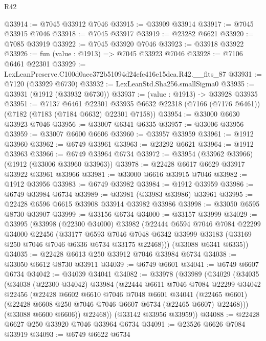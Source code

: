 \begin{lexlean}{R42}
\begin{coremodule}
{@33914 := @7045 @33912 @7046
@33915 := @33909 @33914
@33917 := @7045 @33915 @7046
@33918 := @7045 @33917
@33919 := @23282 @6621
@33920 := @7085 @33919
@33922 := @7045 @33920 @7046
@33923 := @33918 @33922
@33926 := fun (value : @1913) => @7045 @33923 @7046
@33928 := @7106 @6461 @22301
@33929 := LexLeanPreserve.C100d0aec372b51094d24efe416e15dca.R42.__fits_87
@33931 := @7120 (@33929 @6730)
@33932 := LexLeanStd.Sha256.smallSigma0
@33935 := @33931 (@1912 (@33932 @6730))
@33937 := (value : @1913) -> @33928 @33935
@33951 := @7137
    @6461
    @22301
    @33935
    @6632
    @22318
    (@7166 (@7176 @6461))
    (@7182 (@7183 (@7184 @6632) @22301 @7158))
@33954 := @33000 @6630 @33923 @7046
@33956 := @33007 @6341 @6335
@33957 := @33006 @33956
@33959 := @33007 @6600 @6606
@33960 := @33957 @33959
@33961 := @1912 @33960
@33962 := @6749 @33961
@33963 := @23292 @6621
@33964 := @1912 @33963
@33966 := @6749 @33964 @6734
@33972 := @33954 (@33962 @33966) (@1912 (@33006 @33960 @33963))
@33978 := @22428 @6617 @6629 @33917 @33922 @33961 @33966
@33981 := @33000 @6616 @33915 @7046
@33982 := @1912 @33956
@33983 := @6749 @33982
@33984 := @1912 @33959
@33986 := @6749 @33984 @6734
@33989 := @33981 (@33983 @33986) @33961
@33995 := @22428 @6596 @6615 @33908 @33914 @33982 @33986
@33998 := @33050 @6595 @8730 @33907
@33999 := @33156 @6734
@34000 := @33157 @33999
@34029 := @33995
    (@33998
      (@22300 @34000)
      @33982
      (@22444
        @6594
        @7046
        @7084
        @22299
        @34000
        @22456
        (@33177
          @6593
          @7046
          @7048
          @6342
          @33999
          @33183
          (@33169 @250 @7046 @7046 @6336 @6734 @33175 @22468)))
      (@33088 @6341 @6335))
@34035 := @22428 @6613 @250 @33912 @7046 @33984 @6734
@34038 := @33050 @6612 @8730 @33911
@34039 := @6749 @6601
@34041 := @6749 @6607 @6734
@34042 := @34039 @34041
@34082 := @33978
    (@33989
      (@34029
        (@34035
          (@34038
            (@22300 @34042)
            @33984
            (@22444
              @6611
              @7046
              @7084
              @22299
              @34042
              @22456
              (@22428
                @6602
                @6610
                @7046
                @7048
                @6601
                @34041
                (@22465 @6601)
                (@22428 @6608 @250 @7046 @7046 @6607 @6734 (@22465 @6607) @22468)))
            (@33088 @6600 @6606))
          @22468))
      (@33142 @33956 @33959))
@34088 := @22428 @6627 @250 @33920 @7046 @33964 @6734
@34091 := @23526 @6626 @7084 @33919
@34093 := @6749 @6622 @6734
}
\end{coremodule}
\end{lexlean}
